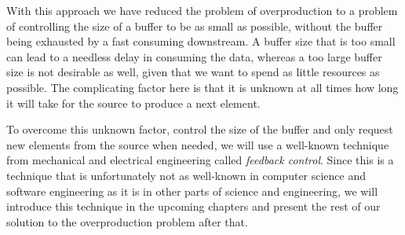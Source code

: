 With this approach we have reduced the problem of overproduction to a problem of controlling the size of a buffer to be as small as possible, without the buffer being exhausted by a fast consuming downstream. A buffer size that is too small can lead to a needless delay in consuming the data, whereas a too large buffer size is not desirable as well, given that we want to spend as little resources as possible. The complicating factor here is that it is unknown at all times how long it will take for the source to produce a next element.

To overcome this unknown factor, control the size of the buffer and only request new elements from the source when needed, we will use a well-known technique from mechanical and electrical engineering called \textit{feedback control}. Since this is a technique that is unfortunately not as well-known in computer science and software engineering as it is in other parts of science and engineering, we will introduce this technique in the upcoming chapters and present the rest of our solution to the overproduction problem after that.